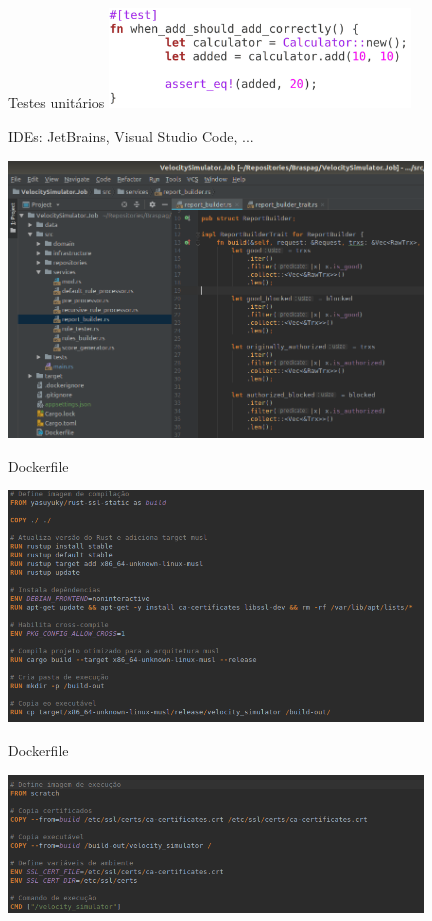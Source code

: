\documentclass[aspectratio=169]{beamer}
\begin{document}
\begin{frame}{Testes unitários}
	\includegraphics[width=8cm]{imgs/unit_tests.png}	
\end{frame}

\begin{frame}{IDEs: JetBrains, Visual Studio Code, ...}
	\begin{center}
		\includegraphics[width=11cm]{imgs/ide.png}	
	\end{center}
\end{frame}

\begin{frame}{Dockerfile}
	\begin{center}
		\includegraphics[width=11cm]{imgs/dockerfile1.png}	
	\end{center}
\end{frame}

\begin{frame}[noframenumbering]{Dockerfile}
	\begin{center}
		\includegraphics[width=11cm]{imgs/dockerfile2.png}	
	\end{center}
\end{frame}
\end{document}

